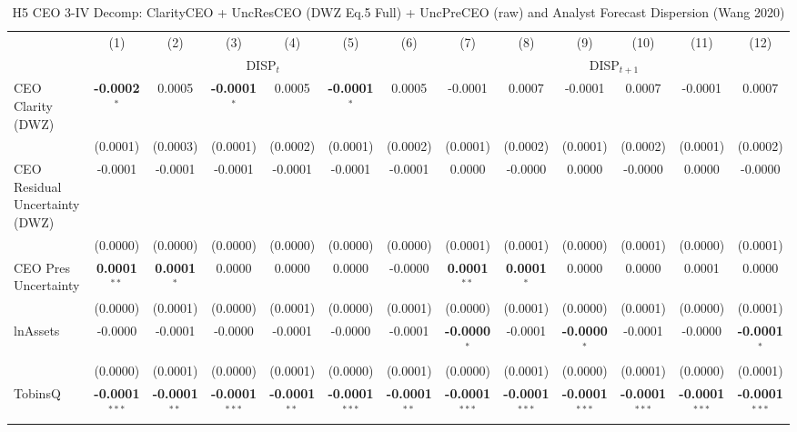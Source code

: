 \begin{landscape}
\begin{table}[H]
\setlength{\tabcolsep}{3pt}
\renewcommand{\arraystretch}{0.85}
\centering
\caption{H5 CEO 3-IV Decomp: ClarityCEO + UncResCEO (DWZ Eq.5 Full) + UncPreCEO (raw) and Analyst Forecast Dispersion (Wang 2020)}
\label{tab:h5_ceo2_decomp}
\scriptsize
\begin{tabular}{lcccccccccccc}
\toprule
 & (1) & (2) & (3) & (4) & (5) & (6) & (7) & (8) & (9) & (10) & (11) & (12) \\
 & \multicolumn{6}{c}{DISP$_{t}$} & \multicolumn{6}{c}{DISP$_{t+1}$} \\
\cmidrule(lr){2-7} \cmidrule(lr){8-13}
\midrule
CEO Clarity (DWZ) & \textbf{-0.0002}$^{*}$ & 0.0005 & \textbf{-0.0001}$^{*}$ & 0.0005 & \textbf{-0.0001}$^{*}$ & 0.0005 & -0.0001 & 0.0007 & -0.0001 & 0.0007 & -0.0001 & 0.0007 \\
 & (0.0001) & (0.0003) & (0.0001) & (0.0002) & (0.0001) & (0.0002) & (0.0001) & (0.0002) & (0.0001) & (0.0002) & (0.0001) & (0.0002) \\
CEO Residual Uncertainty (DWZ) & -0.0001 & -0.0001 & -0.0001 & -0.0001 & -0.0001 & -0.0001 & 0.0000 & -0.0000 & 0.0000 & -0.0000 & 0.0000 & -0.0000 \\
 & (0.0000) & (0.0000) & (0.0000) & (0.0000) & (0.0000) & (0.0000) & (0.0001) & (0.0001) & (0.0000) & (0.0001) & (0.0000) & (0.0001) \\
CEO Pres Uncertainty & \textbf{0.0001}$^{**}$ & \textbf{0.0001}$^{*}$ & 0.0000 & 0.0000 & 0.0000 & -0.0000 & \textbf{0.0001}$^{**}$ & \textbf{0.0001}$^{*}$ & 0.0000 & 0.0000 & 0.0001 & 0.0000 \\
 & (0.0000) & (0.0001) & (0.0000) & (0.0001) & (0.0000) & (0.0001) & (0.0000) & (0.0001) & (0.0000) & (0.0001) & (0.0000) & (0.0001) \\
\midrule
lnAssets & -0.0000 & -0.0001 & -0.0000 & -0.0001 & -0.0000 & -0.0001 & \textbf{-0.0000}$^{*}$ & -0.0001 & \textbf{-0.0000}$^{*}$ & -0.0001 & -0.0000 & \textbf{-0.0001}$^{*}$ \\
 & (0.0000) & (0.0001) & (0.0000) & (0.0001) & (0.0000) & (0.0001) & (0.0000) & (0.0001) & (0.0000) & (0.0001) & (0.0000) & (0.0001) \\
TobinsQ & \textbf{-0.0001}$^{***}$ & \textbf{-0.0001}$^{**}$ & \textbf{-0.0001}$^{***}$ & \textbf{-0.0001}$^{**}$ & \textbf{-0.0001}$^{***}$ & \textbf{-0.0001}$^{**}$ & \textbf{-0.0001}$^{***}$ & \textbf{-0.0001}$^{***}$ & \textbf{-0.0001}$^{***}$ & \textbf{-0.0001}$^{***}$ & \textbf{-0.0001}$^{***}$ & \textbf{-0.0001}$^{***}$ \\

\end{tabular}
\end{table}
\end{landscape}
